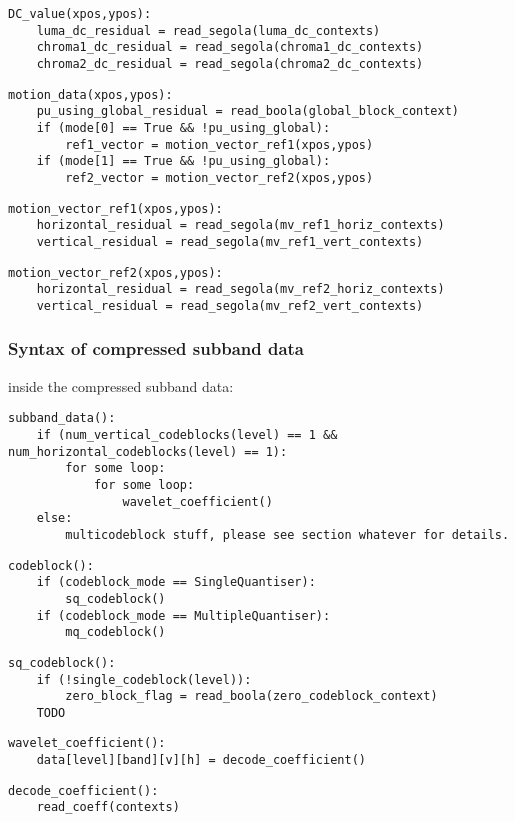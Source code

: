 \begin{verbatim}
DC_value(xpos,ypos):
    luma_dc_residual = read_segola(luma_dc_contexts)
    chroma1_dc_residual = read_segola(chroma1_dc_contexts)
    chroma2_dc_residual = read_segola(chroma2_dc_contexts)
\end{verbatim}

\begin{verbatim}
motion_data(xpos,ypos):
    pu_using_global_residual = read_boola(global_block_context)
    if (mode[0] == True && !pu_using_global):
        ref1_vector = motion_vector_ref1(xpos,ypos)
    if (mode[1] == True && !pu_using_global):
        ref2_vector = motion_vector_ref2(xpos,ypos)
\end{verbatim}

\begin{verbatim}
motion_vector_ref1(xpos,ypos):
    horizontal_residual = read_segola(mv_ref1_horiz_contexts)
    vertical_residual = read_segola(mv_ref1_vert_contexts)
\end{verbatim}

\begin{verbatim}
motion_vector_ref2(xpos,ypos):
    horizontal_residual = read_segola(mv_ref2_horiz_contexts)
    vertical_residual = read_segola(mv_ref2_vert_contexts)
\end{verbatim}


\subsubsection{Syntax of compressed subband data}
inside the compressed subband data:

\begin{verbatim}
subband_data():
    if (num_vertical_codeblocks(level) == 1 && num_horizontal_codeblocks(level) == 1):
        for some loop:
            for some loop:
                wavelet_coefficient()
    else:
        multicodeblock stuff, please see section whatever for details.
\end{verbatim}

\begin{verbatim}
codeblock():
    if (codeblock_mode == SingleQuantiser):
        sq_codeblock()
    if (codeblock_mode == MultipleQuantiser):
        mq_codeblock()
\end{verbatim}

\begin{verbatim}
sq_codeblock():
    if (!single_codeblock(level)):
        zero_block_flag = read_boola(zero_codeblock_context)
    TODO
\end{verbatim}

\begin{verbatim}
wavelet_coefficient():
    data[level][band][v][h] = decode_coefficient()
\end{verbatim}

\begin{verbatim}
decode_coefficient():
    read_coeff(contexts)
\end{verbatim}
